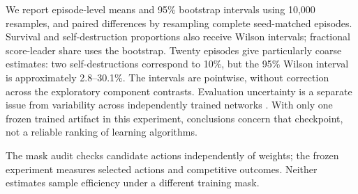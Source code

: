We report episode-level means and 95\% bootstrap intervals using 10,000
resamples, and paired differences by resampling complete seed-matched
episodes. Survival and self-destruction proportions also receive Wilson
intervals; fractional score-leader share uses the bootstrap.
Twenty episodes
give particularly coarse estimates: two self-destructions correspond to
10\%, but the 95\% Wilson interval is approximately 2.8--30.1\%.
The intervals are pointwise, without correction across the exploratory
component contrasts. Evaluation
uncertainty is a separate issue from variability across independently
trained networks \citep{henderson2018matters,agarwal2021precipice}. With only
one frozen trained artifact in this experiment, conclusions concern that
checkpoint, not a
reliable ranking of learning algorithms.

The mask audit checks candidate actions independently of weights; the
frozen experiment measures selected actions and competitive outcomes.
Neither estimates sample efficiency under a different training mask.
